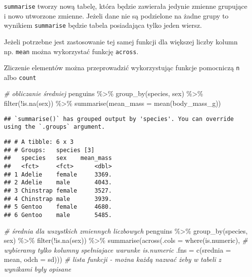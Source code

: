 \documentclass[
]{book}
\newenvironment{Shaded}{\begin{snugshade}}{\end{snugshade}}
\newcommand{\AttributeTok}[1]{\textcolor[rgb]{0.77,0.63,0.00}{#1}}
\newcommand{\CommentTok}[1]{\textcolor[rgb]{0.56,0.35,0.01}{\textit{#1}}}
\newcommand{\FunctionTok}[1]{\textcolor[rgb]{0.00,0.00,0.00}{#1}}
\newcommand{\NormalTok}[1]{#1}
\newcommand{\SpecialCharTok}[1]{\textcolor[rgb]{0.00,0.00,0.00}{#1}}
\begin{document}
\texttt{summarise} tworzy nową tabelę, która będzie zawierała jedynie zmienne grupujące i nowo utworzone zmienne. Jeżeli dane nie są podzielone na żadne grupy to wynikiem \texttt{summarise} będzie tabela posiadająca tylko jeden wiersz.

Jeżeli potrzebne jest zastosowanie tej samej funkcji dla większej liczby kolumn np. \texttt{mean} można wykorzystać funkcję \texttt{across}.

Zliczenie elementów można przeprowadzić wykorzystując funkcje pomocniczą \texttt{n} albo \texttt{count}

\begin{Shaded}
\begin{Highlighting}[]
\CommentTok{\# obliczanie średniej}
\NormalTok{penguins }\SpecialCharTok{\%\textgreater{}\%} \FunctionTok{group\_by}\NormalTok{(species, sex) }\SpecialCharTok{\%\textgreater{}\%} \FunctionTok{filter}\NormalTok{(}\SpecialCharTok{!}\FunctionTok{is.na}\NormalTok{(sex)) }\SpecialCharTok{\%\textgreater{}\%}
  \FunctionTok{summarise}\NormalTok{(}\AttributeTok{mean\_mass =} \FunctionTok{mean}\NormalTok{(body\_mass\_g))}
\end{Highlighting}
\end{Shaded}

\begin{verbatim}
## `summarise()` has grouped output by 'species'. You can override using the `.groups` argument.
\end{verbatim}

\begin{verbatim}
## # A tibble: 6 x 3
## # Groups:   species [3]
##   species   sex    mean_mass
##   <fct>     <fct>      <dbl>
## 1 Adelie    female     3369.
## 2 Adelie    male       4043.
## 3 Chinstrap female     3527.
## 4 Chinstrap male       3939.
## 5 Gentoo    female     4680.
## 6 Gentoo    male       5485.
\end{verbatim}

\begin{Shaded}
\begin{Highlighting}[]
\CommentTok{\# średnia dla wszystkich zmiennych liczbowych}
\NormalTok{penguins }\SpecialCharTok{\%\textgreater{}\%} \FunctionTok{group\_by}\NormalTok{(species, sex) }\SpecialCharTok{\%\textgreater{}\%} \FunctionTok{filter}\NormalTok{(}\SpecialCharTok{!}\FunctionTok{is.na}\NormalTok{(sex)) }\SpecialCharTok{\%\textgreater{}\%}
  \FunctionTok{summarise}\NormalTok{(}\FunctionTok{across}\NormalTok{(}\AttributeTok{.cols =} \FunctionTok{where}\NormalTok{(is.numeric), }\CommentTok{\# wybieramy tylko kolumny spełniajace warunke is.numeric}
                   \AttributeTok{.fns =} \FunctionTok{c}\NormalTok{(}\AttributeTok{srednia =}\NormalTok{ mean, }\AttributeTok{odch =}\NormalTok{ sd))) }\CommentTok{\# lista funkcji {-} można każdą nazwać żeby w tabeli z wynikami były opisane}
\end{Highlighting}
\end{Shaded}
\end{document}
